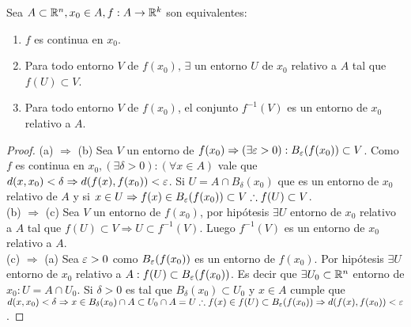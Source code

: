 \begin{prop}
  Sea \(A \subset \mathbb{R}^n, x_0 \in A, f: A \to \mathbb{R}^k\) son equivalentes:
  \begin{enumerate}
    \item \(f\) es continua en \(x_0\).
    \item Para todo entorno \(V\) de \(f(x_0)\text{, }\exists \) un entorno \(U\) de \(x_0\) relativo a \(A\) tal que \(f(U) \subset V\).
    \item Para todo entorno \(V\) de \(f(x_0)\), el conjunto \(f^{-1}(V)\) es un entorno de \(x_0\) relativo a \(A\).
  \end{enumerate}

  \begin{proof}
    (a) \(\Rightarrow \) (b) Sea \(V\) un entorno de \(f(x_0) \Rightarrow (\exists \varepsilon > 0) : B_{\varepsilon}(f(x_0)) \subset V\). Como \(f\) es continua en \(x_0, (\exists \delta > 0) : (\forall x \in A)\) vale que \(d(x, x_0) < \delta \Rightarrow d(f(x), f(x_0)) < \varepsilon \). Si \(U = A \cap B_{\delta}(x_0)\) que es un entorno de \(x_0\) relativo de \(A\) y si \(x \in U \Rightarrow f(x) \in B_{\varepsilon}(f(x_0)) \subset V \therefore f(U) \subset V\). \\
    (b) \(\Rightarrow \) (c) Sea \(V\) un entorno de \(f(x_0)\), por hipótesis \(\exists U\) entorno de \(x_0\) relativo a \(A\) tal que \(f(U) \subset V \Rightarrow U \subset f^{-1}(V)\). Luego \(f^{-1}(V)\) es un entorno de \(x_0\) relativo a \(A\). \\
    (c) \(\Rightarrow \) (a) Sea \(\varepsilon > 0\) como \(B_{\varepsilon}(f(x_0))\) es un entorno de \(f(x_0)\). Por hipótesis \(\exists U\) entorno de \(x_0\) relativo a \(A : f(U) \subset B_{\varepsilon}(f(x_0))\). Es decir que \(\exists U_0 \subset \mathbb{R}^n\) entorno de \(x_0 : U = A \cap U_0\). Si \(\delta > 0\) es tal que \(B_{\delta}(x_0) \subset U_0\) y \(x \in A\) cumple que \(d(x, x_0) < \delta \Rightarrow x \in B_{\delta}(x_0) \cap A \subset U_0 \cap A = U \therefore f(x) \in f(U) \subset B_{\varepsilon}(f(x_0))  \Rightarrow d(f(x), f(x_0)) < \varepsilon \).
  \end{proof}
\end{prop}

